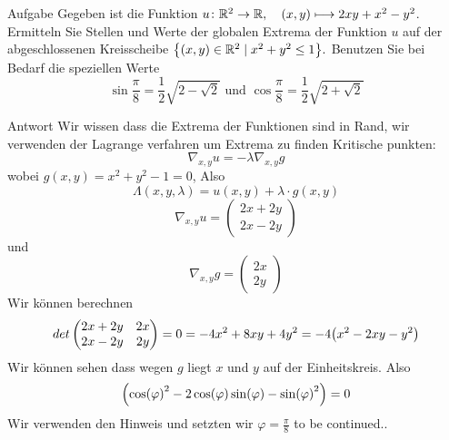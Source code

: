 \documentclass{scrartcl}
\begin{document}
\begin{section}{Aufgabe}%
Gegeben ist die Funktion $u\colon\mathbb{R}^2\to\mathbb{R},\quad(x,y)\longmapsto2xy+x^2-y^2$. Ermitteln Sie Stellen
und Werte der globalen Extrema der Funktion $u$ auf der abgeschlossenen Kreisscheibe $\qty{(x, y) \in \mathbb{R}^2\mid x^2 + y^2 \leq 1}.$
Benutzen Sie bei Bedarf die speziellen Werte  \[ \sin \frac{\pi}{8}=\frac{1}{2} \sqrt{2-\sqrt{2}} \text { und } \cos \frac{\pi}{8}=\frac{1}{2} \sqrt{2+\sqrt{2}} \]
    \begin{subsection}{Antwort}
  Wir wissen dass die Extrema der Funktionen sind in Rand, wir verwenden der Lagrange verfahren um Extrema zu finden Kritische punkten:
  \[\nabla_{x,y} u = - \lambda \nabla_{x,y} g\]
  wobei $g(x,y)=x^2+y^2-1=0$,
  Also 
  \[\Lambda(x,y,\lambda) = u(x,y) + \lambda \cdot g(x,y)\]
  \[\nabla_{x,y} u=\begin{pmatrix}
      2 x + 2 y\\
      2 x - 2 y
  \end{pmatrix}\]
  und
    \[\nabla_{x,y} g=\begin{pmatrix}
      2 x \\
      2 y
  \end{pmatrix}\]
   Wir können berechnen \[det\begin{pmatrix}
 2 x+2 y & 2 x \\
 2 x-2 y & 2 y \\
\end{pmatrix}=0=-4 x^2+8 x y+4 y^2=-4 \qty(x^2-2 x y-y^2)
\]
Wir können sehen dass wegen $g$ liegt $x$ und $y$ auf der Einheitskreis. Also
\[\qty(\cos(\varphi)^2-2 \cos(\varphi) \sin(\varphi)-\sin(\varphi)^2)=0\]
Wir verwenden den Hinweis und setzten wir $\varphi=\frac{\pi}{8}$
to be continued..


\end{subsection}
\end{section}
\end{document}
